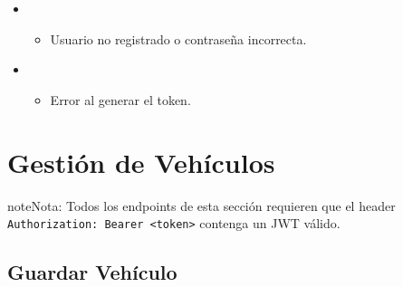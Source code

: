\documentclass[a4paper,11pt,spanish]{sphinxmanual}
\newcommand{\robotoMonoBold}{\fontseries{b}\selectfont\ttfamily}
\renewcommand{\sphinxcode}[1]{\textcolor{sphinxorangeCode}{{\robotoMonoBold #1}}}
\renewcommand{\sphinxupquote}[1]{\texttt{#1}}
\begin{document}
\begin{fulllineitems}
\begin{itemize}
\begin{itemize}
\end{itemize}

\begin{sphinxVerbatim}[commandchars=\\\{\}]
\end{sphinxVerbatim}

\item {} 
\sphinxAtStartPar
{}
\begin{itemize}
\item {} 
\sphinxAtStartPar
Usuario no registrado o contraseña incorrecta.

\end{itemize}

\begin{sphinxVerbatim}[commandchars=\\\{\}]
\end{sphinxVerbatim}

\item {} 
\sphinxAtStartPar
{}
\begin{itemize}
\item {} 
\sphinxAtStartPar
Error al generar el token.

\end{itemize}

\end{itemize}

\end{fulllineitems}



\section{Gestión de Vehículos}
\label{\detokenize{endpoints:gestion-de-vehiculos}}
\begin{sphinxadmonition}{note}{Nota:}
\sphinxAtStartPar
Todos los endpoints de esta sección requieren que el header \sphinxcode{\sphinxupquote{Authorization: Bearer \textless{}token\textgreater{}}} contenga un JWT válido.
\end{sphinxadmonition}


\subsection{Guardar Vehículo}
\label{\detokenize{endpoints:guardar-vehiculo}}
\end{document}
